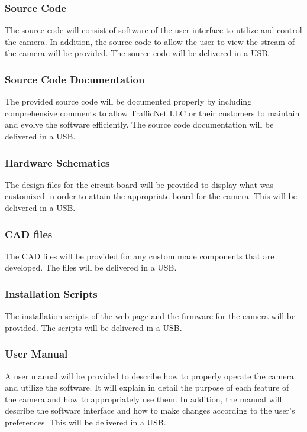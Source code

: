 \subsubsection{Source Code}
The source code will consist of software of the user interface to utilize and control the camera. In addition, the source code to allow the user to view the stream of the camera will be provided.  The source code will be delivered in a USB. 

\subsubsection{Source Code Documentation}
The provided source code will be documented properly by including comprehensive comments to allow TrafficNet LLC or their customers to maintain and evolve the software efficiently. The source code documentation will be delivered in a USB. 

\subsubsection{Hardware Schematics}
The design files for the circuit board will be provided to display what was customized in order to attain the appropriate board for the camera. This will be delivered in a USB.

\subsubsection{CAD files}
The CAD files will be provided for any custom made components that are developed. The files will be delivered in a USB. 

\subsubsection{Installation Scripts}
The installation scripts of the web page and the firmware for the camera will be provided. The scripts will be delivered in a USB. 

\subsubsection{User Manual}
A user manual will be provided to describe how to properly operate the camera and utilize the software. It will explain in detail the purpose of each feature of the camera and how to appropriately use them. In addition, the manual will describe the software interface and how to make changes according to the user’s preferences. This will be delivered in a USB. 


